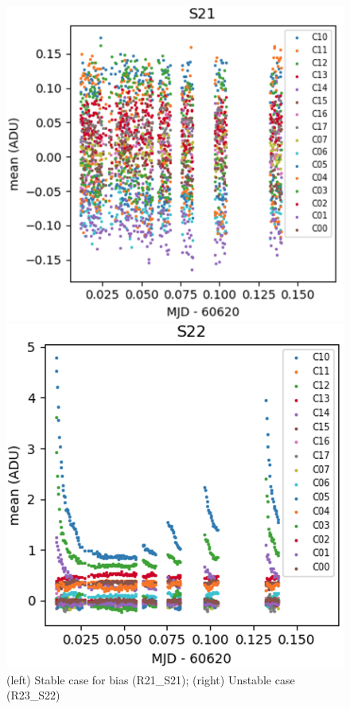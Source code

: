 \begin{figure}[h]
\centering
\begin{minipage}[b]{0.5\textwidth}
\centering
\includegraphics[width=\textwidth]{figures/E2136_R21_S21.png}
\end{minipage}
\begin{minipage}[b]{0.45\textwidth}
\centering
\includegraphics[width=\textwidth]{figures/E2136_R23_S22.png}
\end{minipage}
\caption{(left) Stable case for bias (R21\_S21); (right) Unstable case (R23\_S22)}
\label{fig:bias-instability}
\end{figure}


